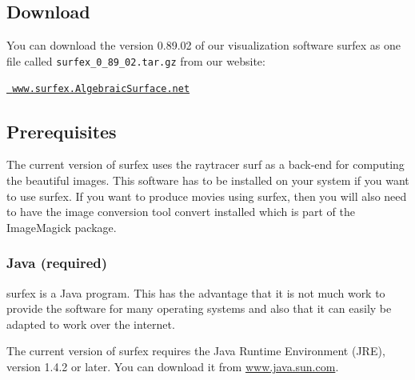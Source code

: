 \documentclass{article}
\newcommand{\surfex}{{\sc surfex}}
\newcommand{\curver}{0.89.02 }
\newcommand{\curverfile}{0\_89\_02}
\begin{document}
%
\subsection{Download}

You can download the version \curver of our visualization software {\sc
  surfex} as one file called {\tt surfex\_\curverfile.tar.gz} from our website:
\begin{center}
\href{http://www.surfex.AlgebraicSurface.net}{\tt
  www.surfex.AlgebraicSurface.net}
\end{center}


%
\subsection{Prerequisites}

The current version of \surfex{}
uses the raytracer {\sc surf} as a back-end for computing the beautiful
images.
This software has to be installed on your system if you want to use
\surfex{}.
If you want to produce movies using \surfex{},
then you will also need to have the image conversion tool {\sc convert}
installed which is part of the {\sc ImageMagick} package.


%
\subsubsection{{\sc Java} (required)}

\surfex{} is a {\sc Java} program.
This has the advantage that it is not much work to provide the software for
many operating systems and also that it can easily be adapted to work over the
internet.

The current version of \surfex{} requires the Java Runtime Environment
(JRE), version 1.4.2 or later.
You can download it from \href{http://www.java.sun.com}{www.java.sun.com}.


%
\end{document}
